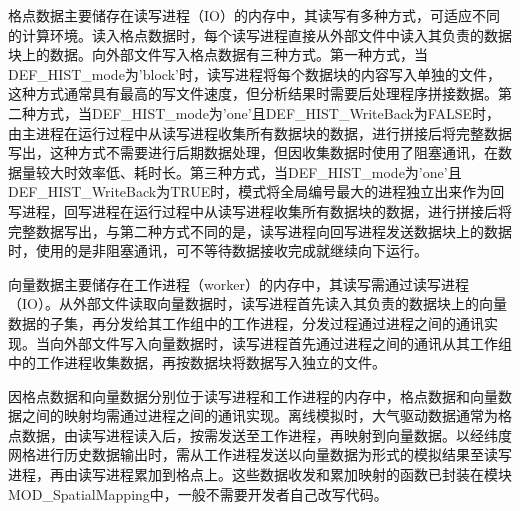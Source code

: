 \documentclass[a4paper,12pt,twoside]{article}
\begin{document}
格点数据主要储存在读写进程（IO）的内存中，其读写有多种方式，可适应不同的计算环境。读入格点数据时，每个读写进程直接从外部文件中读入其负责的数据块上的数据。向外部文件写入格点数据有三种方式。第一种方式，当DEF\_HIST\_mode为'block'时，读写进程将每个数据块的内容写入单独的文件，这种方式通常具有最高的写文件速度，但分析结果时需要后处理程序拼接数据。第二种方式，当DEF\_HIST\_mode为'one'且DEF\_HIST\_WriteBack为FALSE时，由主进程在运行过程中从读写进程收集所有数据块的数据，进行拼接后将完整数据写出，这种方式不需要进行后期数据处理，但因收集数据时使用了阻塞通讯，在数据量较大时效率低、耗时长。第三种方式，当DEF\_HIST\_mode为'one'且DEF\_HIST\_WriteBack为TRUE时，模式将全局编号最大的进程独立出来作为回写进程，回写进程在运行过程中从读写进程收集所有数据块的数据，进行拼接后将完整数据写出，与第二种方式不同的是，读写进程向回写进程发送数据块上的数据时，使用的是非阻塞通讯，可不等待数据接收完成就继续向下运行。

向量数据主要储存在工作进程（worker）的内存中，其读写需通过读写进程（IO）。从外部文件读取向量数据时，读写进程首先读入其负责的数据块上的向量数据的子集，再分发给其工作组中的工作进程，分发过程通过进程之间的通讯实现。当向外部文件写入向量数据时，读写进程首先通过进程之间的通讯从其工作组中的工作进程收集数据，再按数据块将数据写入独立的文件。

因格点数据和向量数据分别位于读写进程和工作进程的内存中，格点数据和向量数据之间的映射均需通过进程之间的通讯实现。离线模拟时，大气驱动数据通常为格点数据，由读写进程读入后，按需发送至工作进程，再映射到向量数据。以经纬度网格进行历史数据输出时，需从工作进程发送以向量数据为形式的模拟结果至读写进程，再由读写进程累加到格点上。这些数据收发和累加映射的函数已封装在模块MOD\_SpatialMapping中，一般不需要开发者自己改写代码。

\end{document}
